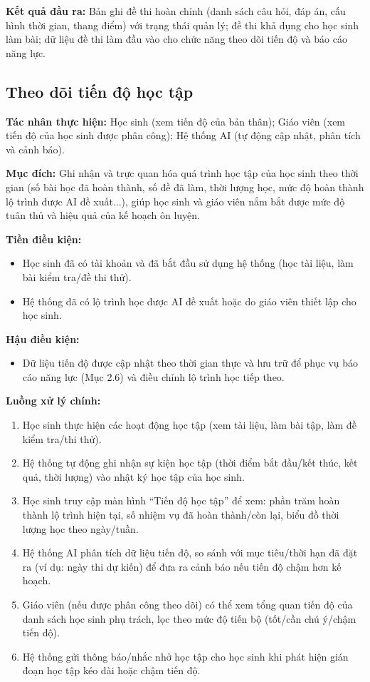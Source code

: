 \documentclass[12pt,a4paper]{article}
\newcommand{\ucfield}[2]{\noindent\textbf{#1: } #2\par\vspace{0.35em}}
\begin{document}
	\ucfield{Kết quả đầu ra}{Bản ghi đề thi hoàn chỉnh (danh sách câu hỏi, đáp án, cấu hình thời gian, thang điểm) với trạng thái quản lý; đề thi khả dụng cho học sinh làm bài; dữ liệu đề thi làm đầu vào cho chức năng theo dõi tiến độ và báo cáo năng lực.}
	
	\subsection{Theo dõi tiến độ học tập}
	
	\ucfield{Tác nhân thực hiện}{Học sinh (xem tiến độ của bản thân); Giáo viên (xem tiến độ của học sinh được phân công); Hệ thống AI (tự động cập nhật, phân tích và cảnh báo).}
	
	\ucfield{Mục đích}{Ghi nhận và trực quan hóa quá trình học tập của học sinh theo thời gian (số bài học đã hoàn thành, số đề đã làm, thời lượng học, mức độ hoàn thành lộ trình được AI đề xuất...), giúp học sinh và giáo viên nắm bắt được mức độ tuân thủ và hiệu quả của kế hoạch ôn luyện.}
	
	\ucfield{Tiền điều kiện}{
		\begin{itemize}[nosep]
			\item Học sinh đã có tài khoản và đã bắt đầu sử dụng hệ thống (học tài liệu, làm bài kiểm tra/đề thi thử).
			\item Hệ thống đã có lộ trình học được AI đề xuất hoặc do giáo viên thiết lập cho học sinh.
	\end{itemize}}
	
	\ucfield{Hậu điều kiện}{
		\begin{itemize}[nosep]
			\item Dữ liệu tiến độ được cập nhật theo thời gian thực và lưu trữ để phục vụ báo cáo năng lực (Mục 2.6) và điều chỉnh lộ trình học tiếp theo.
	\end{itemize}}
	
	\ucfield{Luồng xử lý chính}{
		\begin{enumerate}[nosep]
			\item Học sinh thực hiện các hoạt động học tập (xem tài liệu, làm bài tập, làm đề kiểm tra/thi thử).
			\item Hệ thống tự động ghi nhận sự kiện học tập (thời điểm bắt đầu/kết thúc, kết quả, thời lượng) vào nhật ký học tập của học sinh.
			\item Học sinh truy cập màn hình ``Tiến độ học tập'' để xem: phần trăm hoàn thành lộ trình hiện tại, số nhiệm vụ đã hoàn thành/còn lại, biểu đồ thời lượng học theo ngày/tuần.
			\item Hệ thống AI phân tích dữ liệu tiến độ, so sánh với mục tiêu/thời hạn đã đặt ra (ví dụ: ngày thi dự kiến) để đưa ra cảnh báo nếu tiến độ chậm hơn kế hoạch.
			\item Giáo viên (nếu được phân công theo dõi) có thể xem tổng quan tiến độ của danh sách học sinh phụ trách, lọc theo mức độ tiến bộ (tốt/cần chú ý/chậm tiến độ).
			\item Hệ thống gửi thông báo/nhắc nhở học tập cho học sinh khi phát hiện gián đoạn học tập kéo dài hoặc chậm tiến độ.
	\end{enumerate}}
	
\end{document}
